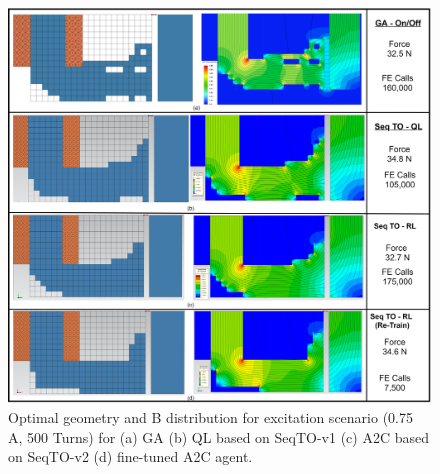 \begin{figure}[h!]
    \centering
    \includegraphics[width=\textwidth]{Figures/Ch_RL/Ccore_0.75A.png}
    \caption{Optimal geometry and B distribution for excitation scenario (0.75 A, 500 Turns) for (a) GA (b) QL based on SeqTO-v1 (c) A2C based on SeqTO-v2 (d) fine-tuned A2C agent.}
    \label{fig:RL_Ccore_0.75A_GeoNB}
\end{figure}


